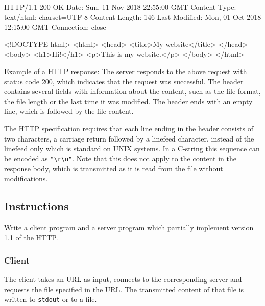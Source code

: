\begin{center}
\begin{minipage}{8cm}
\begin{osuefmtcode}
HTTP/1.1 200 OK
Date: Sun, 11 Nov 2018 22:55:00 GMT
Content-Type: text/html; charset=UTF-8
Content-Length: 146
Last-Modified: Mon, 01 Oct 2018 12:15:00 GMT
Connection: close

<!DOCTYPE html>
<html>
  <head>
    <title>My website</title>
  </head>
  <body>
    <h1>Hi!</h1>
    <p>This is my website.</p>
  </body>
</html>
\end{osuefmtcode}
\end{minipage}
\begin{minipage}{12cm}
\vspace{3mm}
\footnotesize{Example of a HTTP response:
The server responds to the above request with status code 200,
which indicates that the request was successful.
The header contains several fields with information about the content,
such as the file format, the file length or the last time it was modified.
The header ends with an empty line, which is followed by the file content.}
\end{minipage}
\end{center}

The HTTP specification requires
that each line ending in the header consists of two characters,
a carriage return followed by a linefeed character,
instead of the linefeed only which is standard on UNIX systems.
In a C-string this sequence can be encoded as \verb|"\r\n"|.
Note that this does not apply to the content in the response body,
which is transmitted as it is read from the file without modifications.

\subsection*{Instructions}

Write a client program and a server program
which partially implement version 1.1 of the HTTP.

\subsubsection*{Client}

The client takes an URL as input,
connects to the corresponding server
and requests the file specified in the URL.
The transmitted content of that file is written to \verb|stdout| or to a file.

